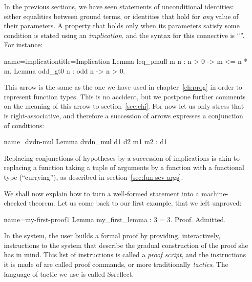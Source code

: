 In the previous sections, we have seen statements of unconditional
identities: either equalities between ground terms, or identities that
hold for \emph{any} value of their parameters. A property that holds
only when its parameters satisfy some condition is stated using an
\emph{implication}, and the \Coq{} syntax for this connective
is ``\C{->}''.  For instance:

\begin{coq}{name=implication}{title=Implication}
Lemma leq_pmull m n : n > 0 -> m <= n * m.
Lemma odd_gt0 n : odd n -> n > 0.
\end{coq}

This arrow \C{->} is the
same as the one we have used in chapter~\ref{ch:prog} in order to
represent function types. This is no accident, but we postpone further
comments on the meaning of this arrow to section~\ref{sec:chi}. For
now let us only stress that \C{->} is right-associative, and
therefore
a succession of arrows expresses a conjunction of conditions:

\begin{coq}{name=dvdn-mul}{}
Lemma dvdn_mul d1 d2 m1 m2 : d1 %
\end{coq}
Replacing conjunctions of hypotheses by a succession of implications is
akin to replacing a function taking a tuple of arguments by a function
with a functional type (``currying''),
as described in section~\ref{sec:fun-sev-args}.



We shall now explain how to turn a well-formed statement into a
machine-checked theorem. Let us come back to our first example, that
we left unproved:
\begin{coq}{name=my-first-proof1}{}
Lemma my_first_lemma : 3 = 3.
Proof.
Admitted.
\end{coq}
In the \Coq{} system, the user builds a formal proof by providing,
interactively, instructions to the \Coq{}
system that describe the gradual construction of the proof she has in
mind. This list of instructions is called a \emph{proof script}, and
the instructions it is made of are called proof commands, or more traditionally
\emph{tactics}.  The language of tactic we use is called
Ssreflect.

